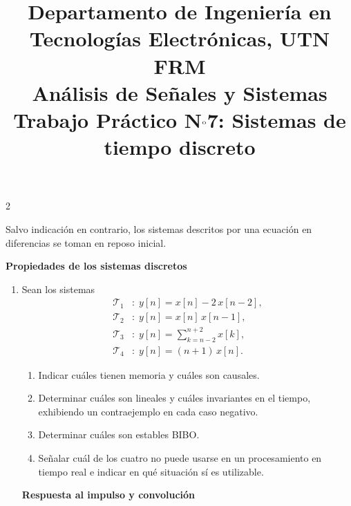 \documentclass[10pt,a4paper]{article}
\title{%
	{\normalsize Departamento de Ingeniería en Tecnologías Electrónicas, UTN FRM}\\[0.1cm]
	{\large Análisis de Señales y Sistemas}\\[0.15cm]
	{\normalsize Trabajo Práctico N$^{\text o}$7: Sistemas de tiempo discreto}%
}
\author{}
\date{}
\begin{document}
	\maketitle
	\thispagestyle{fancy}

	\begin{multicols}{2}

		\label{sec:enun}

		{\small\noindent Salvo indicación en contrario, los sistemas
		descritos por una ecuación en diferencias se toman en reposo
		inicial.}

		\vspace{0.4em}

		\textbf{Propiedades de los sistemas discretos}
		\begin{enumerate}

		\item Sean los sistemas
		\begin{align*}
			\mathcal{T}_1&: \; y[n] = x[n] - 2\,x[n-2], \\
			\mathcal{T}_2&: \; y[n] = x[n]\,x[n-1], \\
			\mathcal{T}_3&: \; y[n] = \textstyle\sum_{k=n-2}^{n+2} x[k], \\
			\mathcal{T}_4&: \; y[n] = (n+1)\,x[n].
		\end{align*}
		\begin{enumerate}
			\item Indicar cuáles tienen memoria y cuáles son causales.
			\item Determinar cuáles son lineales y cuáles invariantes en el
			tiempo, exhibiendo un contraejemplo en cada caso negativo.
			\item Determinar cuáles son estables BIBO.
			\item Señalar cuál de los cuatro no puede usarse en un
			procesamiento en tiempo real e indicar en qué situación sí es
			utilizable.
		\end{enumerate}

		\textbf{Respuesta al impulso y convolución}


\end{enumerate}
\end{multicols}
\end{document}
